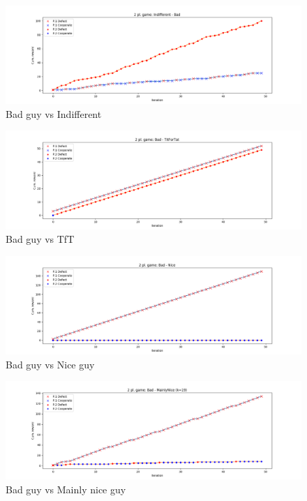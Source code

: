 \documentclass[journal,a4paper,10pt,twoside]{IEEEtran}
\begin{document}
\begin{figure}
    \centering
    \includegraphics[width=1\columnwidth]{../img_v1/idp2p-rewards-Indifferent-Bad.png}
    \caption{Bad guy vs Indifferent}
    \label{fig:badvsindiff}
\end{figure}

\begin{figure}
    \centering
    \includegraphics[width=1\columnwidth]{../img_v1/idp2p-rewards-Bad-TitForTat.png}
    \caption{Bad guy vs TfT}
    \label{fig:badvstft}
\end{figure}

\begin{figure}
    \centering
    \includegraphics[width=1\columnwidth]{../img_v1/idp2p-rewards-Bad-Nice.png}
    \caption{Bad guy vs Nice guy}
    \label{fig:badvsnice}
\end{figure}

\begin{figure}
    \centering
    \includegraphics[width=1\columnwidth]{../img_v1/idp2p-rewards-Bad-MainlyNice (k=19).png}
    \caption{Bad guy vs Mainly nice guy}
    \label{fig:badvsmainlynice}
\end{figure}
\end{document}
